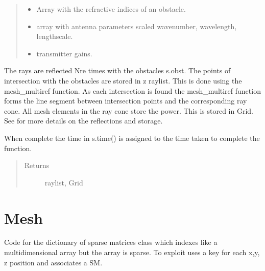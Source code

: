 \documentclass[letterpaper,10pt,english]{sphinxmanual}
\begin{document}
\begin{fulllineitems}
\begin{fulllineitems}
\begin{quote}
\begin{description}
\begin{itemize}
\item {} 
 \textendash{} Array with the refractive indices of an obstacle.

\item {} 
 \textendash{} array with antenna parameters \sphinxhyphen{} scaled wavenumber, wavelength, lengthscale.

\item {} 
 \textendash{} transmitter gains.

\end{itemize}

\end{description}\end{quote}

The rays are reflected Nre times with the obstacles s.obst.     The points of intersection with the obstacles are stored in z
raylist. This is done using the mesh\_multiref function.
As each intersection is found the mesh\_multiref function     forms the line segment between intersection points and the     corresponding ray cone. All mesh elements in the ray cone store     the power. This is stored in Grid.
See  for more details on the     reflections and storage.

When complete the time in s.time() is assigned to the time taken     to complete the function.
\begin{quote}\begin{description}
\item[{Returns}] \leavevmode
raylist, Grid

\end{description}\end{quote}

\end{fulllineitems}


\end{fulllineitems}



\chapter{Mesh}
\label{\detokenize{index:module-DictionarySparseMatrix}}\label{\detokenize{index:mesh}}
Code for the dictionary of sparse matrices class {\hyperref[\detokenize{index:DictionarySparseMatrix.DS}]{}} which indexes like a multidimensional array but the array is sparse.  To exploit  uses a key for  each x,y, z position and associates a SM.
\end{document}
